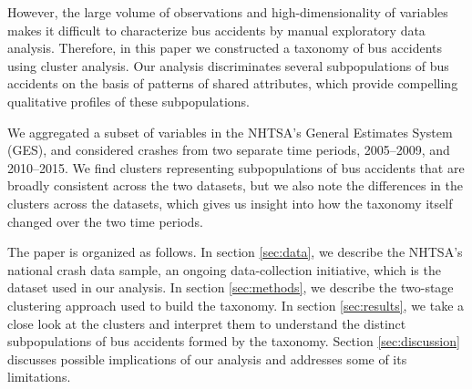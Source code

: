 However, the large volume of observations and high-dimensionality of
variables makes it difficult to characterize bus accidents by manual
exploratory data analysis. Therefore, in this paper we constructed a
taxonomy of bus accidents using cluster analysis. Our analysis
discriminates several subpopulations of bus accidents on the basis of patterns of shared
attributes, which provide compelling qualitative profiles of these subpopulations.

We aggregated a subset of variables in the NHTSA's General Estimates
System (GES), and considered crashes from two separate time periods,
2005--2009, and 2010--2015. We find clusters representing
subpopulations of bus accidents that are broadly consistent across the
two datasets, but we also note the differences in the clusters across
the datasets, which gives us insight into how the taxonomy itself
changed over the two time periods.

The paper is organized as follows. In section \ref{sec:data}, 
we describe the NHTSA's national crash data sample, an ongoing data-collection
initiative, which is the dataset used in our analysis.
In section \ref{sec:methods}, we describe the two-stage clustering approach
used to build the taxonomy. In section \ref{sec:results}, we 
take a close look at the clusters and interpret them to understand the 
distinct subpopulations of bus accidents formed by the taxonomy. Section \ref{sec:discussion}
discusses possible implications of our analysis and addresses some of its limitations.
